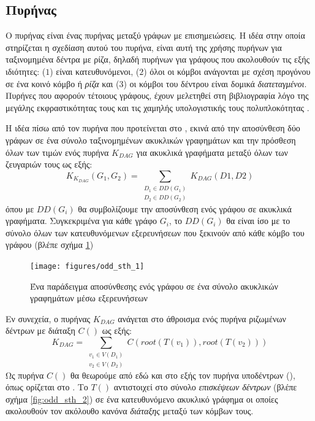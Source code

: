 \subsection{Πυρήνας }
\label{ssec:odd-sth}
Ο πυρήνας  είναι ένας πυρήνας μεταξύ γράφων με επισημειώσεις.
Η ιδέα στην οποία στηρίζεται η σχεδίαση αυτού του πυρήνα, είναι αυτή της χρήσης πυρήνων για ταξινομημένα δέντρα με ρίζα, δηλαδή πυρήνων για γράφους που ακολουθούν τις εξής ιδιότητες: ($1$) είναι κατευθυνόμενοι, ($2$) όλοι οι κόμβοι ανάγονται με σχέση προγόνου σε ένα κοινό κόμβο ή \textit{ρίζα} και ($3$) οι κόμβοι του δέντρου είναι δομικά \textit{διατεταγμένοι}.
Πυρήνες που αφορούν τέτοιους γράφους, έχουν μελετηθεί στη βιβλιογραφία λόγο της μεγάλης εκφραστικότητας τους και τις χαμηλής υπολογιστικής τους πολυπλοκότητας \cite{Haussler99ck, MA_ECML_2006, Vishwanathan2002}.\par
Η ιδέα πίσω από τον πυρήνα  που προτείνεται στο \cite{Martino2012ATK}, εκινά από την αποσύνθεση δύο γράφων σε ένα σύνολο ταξινομημένων ακυκλικών γραφημάτων και την πρόσθεση όλων των τιμών ενός πυρήνα $K_{DAG}$ για ακυκλικά γραφήματα μεταξύ όλων των ζευγαριών τους ως εξής:
\begin{equation}
K_{K_{DAG}}(G_{1}, G_{2}) = \sum_{\substack{D_{1} \in DD(G_{1}) \\
D_{2} \in DD(G_{2})}} K_{DAG}(D1, D2)
\end{equation}
όπου με $DD(G_{i})$ θα συμβολίζουμε την αποσύνθεση ενός γράφου σε ακυκλικά γραφήματα.
Συγκεκριμένα για κάθε γράφο $G_{i}$, το $DD(G_{i})$ θα είναι ίσο με το σύνολο όλων των κατευθυνόμενων εξερευνήσεων  που ξεκινούν από κάθε κόμβο του γράφου (βλέπε σχήμα \ref{fig:odd:bfs_explorations})
\begin{figure}[]
\centering
\texttt{[image: figures/odd\_sth\_1]}
\caption{Ένα παράδειγμα αποσύνθεσης ενός γράφου σε ένα σύνολο ακυκλικών γραφημάτων μέσω εξερευνήσεων }
\label{fig:odd:bfs_explorations}
\end{figure}
Εν συνεχεία, ο πυρήνας $K_{DAG}$ ανάγεται στο άθροισμα ενός πυρήνα ριζωμένων δέντρων με διάταξη $C()$ ως εξής:
\begin{equation}
K_{DAG} = \sum_{\substack{v_{1} \in V(D_{1}) \\ v_{2} \in V(D_{2})}} C(root(T(v_{1})), root(T(v_{2})))
\end{equation}
Ως πυρήνα $C()$ θα θεωρούμε από εδώ και στο εξής τον πυρήνα υποδέντρων (), όπως ορίζεται στο \cite{STKernel}.
Το $T()$ αντιστοιχεί στο σύνολο \textit{επισκέψεων δέντρων} (βλέπε σχήμα \ref{fig:odd_sth_2}) σε ένα κατευθυνόμενο ακυκλικό γράφημα οι οποίες ακολουθούν τον ακόλουθο κανόνα \textit{διάταξης} μεταξύ των κόμβων τους.
